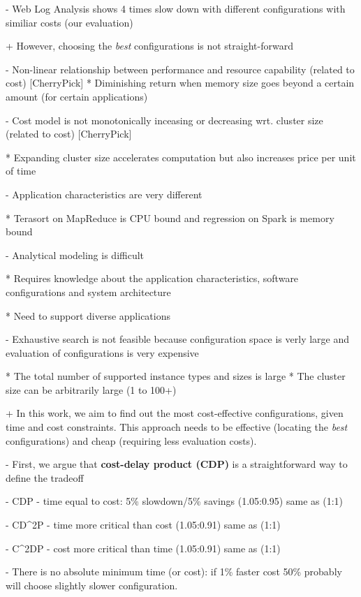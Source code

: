   - Web Log Analysis shows 4 times slow down with different configurations
  with similiar costs (our evaluation)


+ However, choosing the \emph{best} configurations is not
  straight-forward

  - Non-linear relationship between performance and resource capability
  (related to cost) {[}CherryPick{]}
    * Diminishing return when memory size goes beyond a certain amount
    (for certain applications)
  
  - Cost model is not monotonically inceasing or decreasing wrt. cluster
  size (related to cost) {[}CherryPick{]}

    * Expanding cluster size accelerates computation but also increases
    price per unit of time
  
  - Application characteristics are very different

    * Terasort on MapReduce is CPU bound and regression on Spark is memory
    bound
    
  - Analytical modeling is difficult
    
    * Requires knowledge about the application characteristics, software
    configurations and system architecture
  
    * Need to support diverse applications

  - Exhaustive search is not feasible because configuration space is verly
  large and evaluation of configurations is very expensive
    
    * The total number of supported instance types and sizes is large
    * The cluster size can be arbitrarily large (1 to 100+)


  
+ In this work, we aim to find out the most cost-effective
  configurations, given time and cost constraints. This approach needs
  to be effective (locating the \emph{best} configurations) and cheap
  (requiring less evaluation costs).
  
  - First, we argue that \textbf{cost-delay product (CDP)} is a
  straightforward way to define the tradeoff
  
  - CDP - time equal to cost: 5\% slowdown/5\% savings (1.05:0.95) same as
  (1:1)

  - CD\^{}2P - time more critical than cost (1.05:0.91) same as (1:1)

  - C\^{}2DP - cost more critical than time (1.05:0.91) same as (1:1)

  - There is no absolute minimum time (or cost): if 1\% faster cost 50\%
  probably will choose slightly slower configuration.

